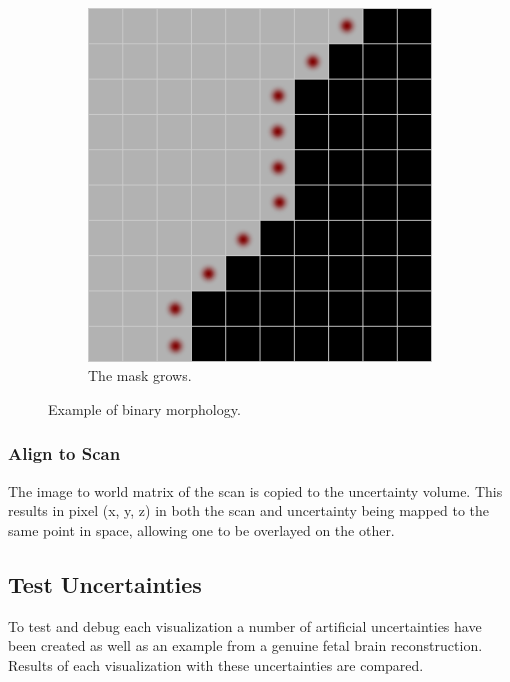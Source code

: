 \begin{figure}[H]
\begin{subfigure}[b]{0.5\textwidth}
    \includegraphics[width=\textwidth]{images/erosion/growing_2.png}
    \caption{The mask grows.}\label{fig:growing_2}
  \end{subfigure}
  \caption{Example of binary morphology.}\label{fig:growing}
\end{figure}

\subsubsection*{Align to Scan}
The image to world matrix of the scan is copied to the uncertainty volume. This results in pixel (x, y, z) in both the scan and uncertainty being mapped to the same point in space, allowing one to be overlayed on the other.


\clearpage
\subsection{Test Uncertainties}\label{method:test_uncertainties}
To test and debug each visualization a number of artificial uncertainties have been created as well as an example from a genuine fetal brain reconstruction. Results of each visualization with these uncertainties are compared.

